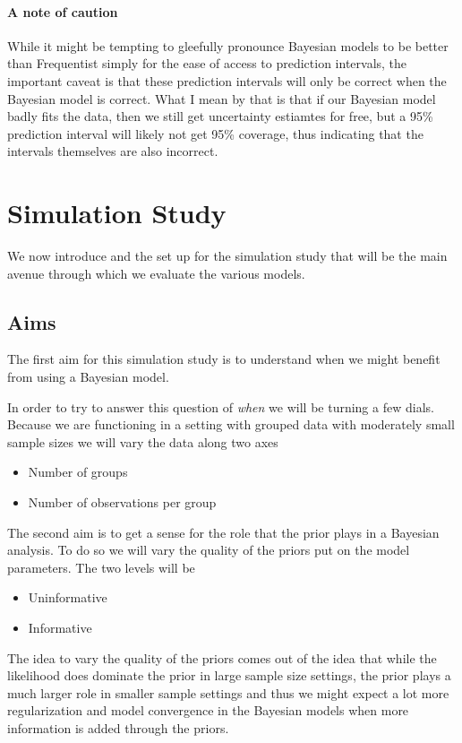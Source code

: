 \documentclass[12pt,twoside]{reedthesis}
\providecommand{\tightlist}{%
  \setlength{\itemsep}{0pt}\setlength{\parskip}{0pt}}
\begin{document}
\hypertarget{a-note-of-caution}{%
\subsubsection{A note of caution}\label{a-note-of-caution}}

While it might be tempting to gleefully pronounce Bayesian models to be better than Frequentist simply for the ease of access to prediction intervals, the important caveat is that these prediction intervals will only be correct when the Bayesian model is correct. What I mean by that is that if our Bayesian model badly fits the data, then we still get uncertainty estiamtes for free, but a 95\% prediction interval will likely not get 95\% coverage, thus indicating that the intervals themselves are also incorrect.

\hypertarget{sim-study}{%
\chapter{Simulation Study}\label{sim-study}}

We now introduce and the set up for the simulation study that will be the main avenue through which we evaluate the various models.

\hypertarget{aims}{%
\section{Aims}\label{aims}}

The first aim for this simulation study is to understand when we might benefit from using a Bayesian model.

In order to try to answer this question of \emph{when} we will be turning a few dials. Because we are functioning in a setting with grouped data with moderately small sample sizes we will vary the data along two axes
\begin{itemize}
\tightlist
\item
  Number of groups
\item
  Number of observations per group
\end{itemize}
The second aim is to get a sense for the role that the prior plays in a Bayesian analysis. To do so we will vary the quality of the priors put on the model parameters. The two levels will be
\begin{itemize}
\tightlist
\item
  Uninformative
\item
  Informative
\end{itemize}
The idea to vary the quality of the priors comes out of the idea that while the likelihood does dominate the prior in large sample size settings, the prior plays a much larger role in smaller sample settings and thus we might expect a lot more regularization and model convergence in the Bayesian models when more information is added through the priors.
\end{document}
